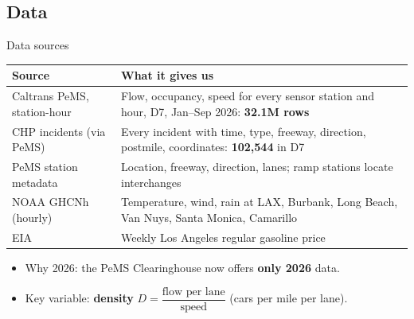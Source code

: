 \documentclass[compress]{beamer}
\newcommand{\hl}[1]{{\color{IITRBlue}\textbf{#1}}}
\begin{document}
\subsection{Data}
\begin{frame}[t]{Data sources}
\footnotesize
\begin{tabular}{L{2.6cm}L{7.6cm}}
\toprule
\textbf{Source} & \textbf{What it gives us} \\
\midrule
Caltrans PeMS, station-hour & Flow, occupancy, speed for every sensor station and hour, D7, Jan--Sep 2026: \hl{32.1M rows} \\
CHP incidents (via PeMS) & Every incident with time, type, freeway, direction, postmile, coordinates: \hl{102,544} in D7 \\
PeMS station metadata & Location, freeway, direction, lanes; ramp stations locate interchanges \\
NOAA GHCNh (hourly) & Temperature, wind, rain at LAX, Burbank, Long Beach, Van Nuys, Santa Monica, Camarillo \\
EIA & Weekly Los Angeles regular gasoline price \\
\bottomrule
\end{tabular}
\vspace{0.6em}
\begin{itemize}
\item Why 2026: the PeMS Clearinghouse now offers \hl{only 2026} data.
\item Key variable: \hl{density} $D = \dfrac{\text{flow per lane}}{\text{speed}}$ (cars per mile per lane).
\end{itemize}
\end{frame}
\end{document}
